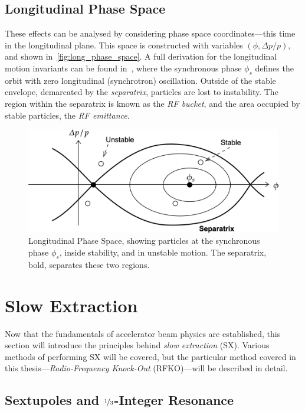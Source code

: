 \documentclass[11pt]{report}
\begin{document}
\subsection{Longitudinal Phase Space}\label{sec:long_phase_space}

These effects can be analysed by considering phase space coordinates---this time in the longitudinal plane. This space is constructed with variables $(\phi , \Delta p/p)$, and shown in~\autoref{fig:long_phase_space}. A full derivation for the longitudinal motion invariants can be found in~\cite{lbd:tecker}, where the synchronous phase $\phi_s$ defines the orbit with zero longitudinal (synchrotron) oscillation. Outside of the stable envelope, demarcated by the \textit{separatrix}, particles are lost to instability. The region within the separatrix is known as the \textit{RF bucket}, and the area occupied by stable particles, the \textit{RF emittance}.

\begin{figure}[h]
  \centering
  \includegraphics*[width=0.9\linewidth]{long-phase-space.png}
  \caption{Longitudinal Phase Space, showing particles at the synchronous phase $\phi_s$, inside stability, and in unstable motion. The separatrix, bold, separates these two regions.}\label{fig:long_phase_space}
\end{figure}

\section{Slow Extraction}\label{sx}
Now that the fundamentals of accelerator beam physics are established, this section will introduce the principles behind \textit{slow extraction} (SX). Various methods of performing SX will be covered, but the particular method covered in this thesis---\textit{Radio-Frequency Knock-Out} (RFKO)---will be described in detail.

\subsection{Sextupoles and $\nicefrac 13$-Integer Resonance}
\end{document}
